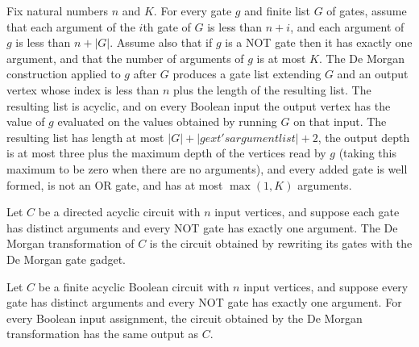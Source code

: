 \begin{theorem}
\label{BoolCircuit.deMorganGadget_correct}
\leanok
{}
Fix natural numbers $n$ and $K$. For every gate $g$ and finite list $G$ of gates, assume
that each argument of the $i$th gate of $G$ is less than $n+i$, and each argument of $g$
is less than $n+|G|$. Assume also that if $g$ is a NOT gate then it has exactly one
argument, and that the number of arguments of $g$ is at most $K$. The De Morgan
construction applied to $g$ after $G$ produces a gate list extending $G$ and an output
vertex whose index is less than $n$ plus the length of the resulting list. The resulting
list is acyclic, and on every Boolean input the output vertex has the value of $g$
evaluated on the values obtained by running $G$ on that input. The resulting list has
length at most $|G|+|g	ext{'s argument list}|+2$, the output depth is at most three plus
the maximum depth of the vertices read by $g$ (taking this maximum to be zero when there
are no arguments), and every added gate is well formed, is not an OR gate, and has at
most $\max(1,K)$ arguments.
\end{theorem}

\begin{definition}
\label{BoolCircuit.DAGCircuit.deMorgan}
\leanok
{}
Let $C$ be a directed acyclic circuit with $n$ input vertices, and suppose each gate has
distinct arguments and every NOT gate has exactly one argument. The De Morgan
transformation of $C$ is the circuit obtained by rewriting its gates with the De Morgan
gate gadget.
\end{definition}

\begin{theorem}
\label{BoolCircuit.DAGCircuit.deMorgan_eval}
\leanok
{}
Let $C$ be a finite acyclic Boolean circuit with $n$ input vertices, and suppose every
gate has distinct arguments and every NOT gate has exactly one argument. For every
Boolean input assignment, the circuit obtained by the De Morgan transformation has the
same output as $C$.
\end{theorem}

